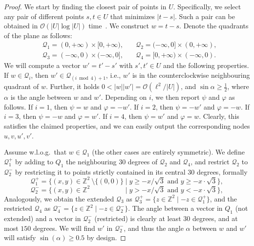 \documentclass[11pt, letterpaper]{article}
\theoremstyle{plain}
\theoremstyle{definition}
\theoremstyle{remark}
\renewcommand{\O}{\mathcal{O}}
\newcommand{\Q}{\mathcal{Q}}
\renewcommand{\phi}{\varphi}
\begin{document}
\GetPeriods
\begin{proof}
We start by finding the closest pair of points in $U$.
Specifically, we select any pair of different points $s, t \in U$ that minimizes $|t - s|$. 
Such a pair can be obtained in $\O(|U| \log |U|)$ time~\cite{Clarkson1983}.
We construct $w = t - s$.
%
Denote the quadrants of the plane as follows:%
%
\begin{align*}
&\Q_1 = (0,+\infty) \times [0,+\infty), \quad & \Q_2 = (-\infty,0] \times (0,+\infty),\\
&\Q_3 = (-\infty,0) \times (-\infty,0], \quad & \Q_4 = [0,+\infty) \times (-\infty,0).
\end{align*}
%
We will compute a vector $w' = t' - s'$ with $s', t' \in U$ and the following properties. If $w \in \Q_i$, then $w' \in \Q_{(i \bmod 4) + 1}$, i.e., $w'$ is in the counterclockwise neighbouring quadrant of $w$. Further, it holds $0 < |w||w'| = \O(\ell^2 / |U|)$, and $\sin \alpha \ge \frac{1}{2}$, where $\alpha$ is the angle between $w$ and $w'$. Depending on $i$, we then report $\psi$ and $\phi$ as follows. If $i = 1$, then $\psi = w$ and $\phi = -w'$. If $i = 2$, then $\psi = -w'$ and $\phi = -w$. If $i = 3$, then $\psi = -w$ and $\phi = w'$. If $i = 4$, then $\psi = w'$ and $\phi = w$. Clearly, this satisfies the claimed properties, and we can easily output the corresponding nodes $u,v,u',v'$.


Assume w.l.o.g.\ that $w \in \Q_1$ (the other cases are entirely symmetric). 
We define $\Q_1^+$ by adding to $Q_1$ the neighbouring $30$ degrees of $\Q_2$ and $\Q_4$, and restrict $\Q_2$ to $\Q_2^-$ by restricting it to points strictly contained in its central 30 degrees, formally
%
$$\Q_1^+ = \{ (x,y) \in \mathbb Z^2{\ \setminus \{(0,0)\}} \mid y \geq -x / \sqrt{3}\text{ and }y \geq -x \cdot \sqrt{3} \},$$
%
$$\Q_2^- = \{ (x,y) \in \mathbb Z^2\phantom{\ \setminus \{(0,0)\}} \mid y > -x / \sqrt{3}\text{ and }y < -x \cdot \sqrt{3}\},$$
%
Analogously, we obtain the extended $\Q_3$ as $\Q_3^+ = \{ z \in \mathbb Z^2 \mid -z \in \Q_1^+ \}$, and the restricted $\Q_4$ as $\Q_4^- = \{ z \in \mathbb Z^2 \mid -z \in \Q_2^- \}$. The angle between a vector in $Q_1$ (not extended) and a vector in $\Q_2^-$ (restricted) is clearly at least $30$ degrees, and at most $150$ degrees. We will find $w'$ in $\Q_2^-$, and thus the angle $\alpha$ between $w$ and $w'$ will satisfy $\sin(\alpha) \geq 0.5$ by design.


\end{proof}
\end{document}
